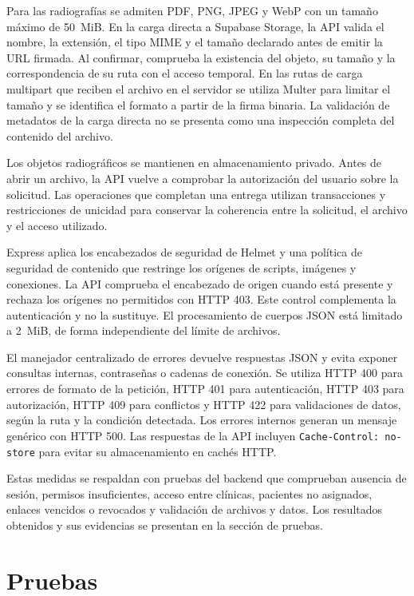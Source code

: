 Para las radiografías se admiten PDF, PNG, JPEG y WebP con un tamaño máximo
de \mbox{50 MiB}. En la carga directa a Supabase Storage, la API valida el
nombre, la extensión, el tipo MIME y el tamaño declarado antes de emitir
la URL firmada. Al confirmar, comprueba la existencia del objeto, su tamaño
y la correspondencia de su ruta con el acceso temporal. En las rutas de
carga multipart que reciben el archivo en el servidor se utiliza Multer
para limitar el tamaño y se identifica el formato a partir de la firma
binaria. La validación de metadatos de la carga directa no se presenta como
una inspección completa del contenido del archivo.

Los objetos radiográficos se mantienen en almacenamiento privado. Antes
de abrir un archivo, la API vuelve a comprobar la autorización del usuario
sobre la solicitud. Las operaciones que completan una entrega utilizan
transacciones y restricciones de unicidad para conservar la coherencia
entre la solicitud, el archivo y el acceso utilizado.

Express aplica los encabezados de seguridad de Helmet y una política de
seguridad de contenido que restringe los orígenes de scripts, imágenes y
conexiones. La API comprueba el encabezado de origen cuando está presente
y rechaza los orígenes no permitidos con HTTP 403. Este control complementa
la autenticación y no la sustituye. El procesamiento de cuerpos JSON está
limitado a \mbox{2 MiB}, de forma independiente del límite de archivos.

El manejador centralizado de errores devuelve respuestas JSON y evita
exponer consultas internas, contraseñas o cadenas de conexión. Se utiliza
HTTP 400 para errores de formato de la petición, HTTP 401 para autenticación,
HTTP 403 para autorización, HTTP 409 para conflictos y HTTP 422 para
validaciones de datos, según la ruta y la condición detectada. Los errores
internos generan un mensaje genérico con HTTP 500. Las respuestas de la
API incluyen \texttt{Cache-Control: no-store} para evitar su almacenamiento
en cachés HTTP.

Estas medidas se respaldan con pruebas del backend que comprueban ausencia
de sesión, permisos insuficientes, acceso entre clínicas, pacientes no
asignados, enlaces vencidos o revocados y validación de archivos y datos.
Los resultados obtenidos y sus evidencias se presentan en la sección de pruebas.

\section{Pruebas}

